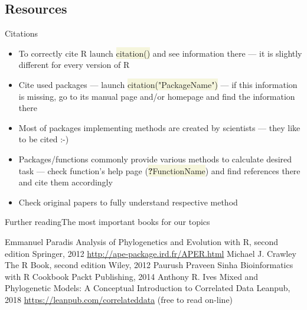 \documentclass[compress, ucs, xelatex, 11pt, xcolor=svgnames, aspectratio=169,
	hyperref={
		bookmarks=true,
		unicode=true,
		colorlinks=true,
		pdftitle={Molecular data in R},
		plainpages=false,
		pdfauthor={Vojtech Zeisek},
		pdfsubject={Course about phylogeny and evolution in R},
		pdfcreator={XeLaTeX},
		pdfkeywords={R, evolution, phylogeny, molecular data},
		linkcolor=Crimson, %
		anchorcolor=Magenta, %
		citecolor=Magenta, %
		filecolor=Magenta, %
		menucolor=Magenta, %
		urlcolor=DodgerBlue, %
		pdftex},
	url={hyphens, lowtilde} %
	]{beamer}
\renewcommand{\texttt}[1]{\colorbox{Beige}{{\ttfamily #1}}}
\begin{document}
\subsection{Resources}

\begin{frame}{Citations}
	\begin{itemize}
		\item To correctly cite R launch \texttt{citation()} and see information there --- it is slightly different for every version of R
		\item Cite used packages --- launch \texttt{citation("PackageName")} --- if this information is missing, go to its manual page and/or homepage and find the information there
		\item Most of packages implementing methods are created by scientists --- they like to be cited :-)
		\item Packages/functions commonly provide various methods to calculate desired task --- check function's help page (\texttt{\textbf{?}FunctionName}) and find references there and cite them accordingly
		\item Check original papers to fully understand respective method
	\end{itemize}
\end{frame}

\begin{frame}{Further reading}{The most important books for our topics}
	\begin{multicols}{2}
		\begin{thebibliography}{1}
				Emmanuel Paradis
				\newblock Analysis of Phylogenetics and Evolution with R, second edition
				\newblock Springer, 2012
				\newblock \url{http://ape-package.ird.fr/APER.html}
				Michael J. Crawley
				\newblock The R Book, second edition
				\newblock Wiley, 2012
				Paurush Praveen Sinha
				\newblock Bioinformatics with R Cookbook
				\newblock Packt Publishing, 2014
				Anthony R. Ives
				\newblock Mixed and Phylogenetic Models: A Conceptual Introduction to Correlated Data
				\newblock Leanpub, 2018
				\newblock \url{https://leanpub.com/correlateddata} (free to read on-line)
		\end{thebibliography}
	\end{multicols}
\end{frame}
\end{document}
